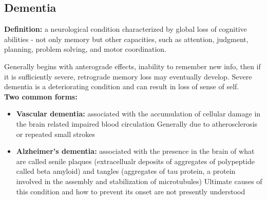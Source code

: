 \documentclass{article}
\begin{document}
\subsection{Dementia}
\textbf{Definition:} a neurological condition characterized by global loss of cognitive abilities - not only memory but other capacities, such as attention, judgment, planning, problem solving, and motor coordination. 

Generally begins with anterograde effects, inability to remember new info, then if it is sufficiently severe, retrograde memory loss may eventually develop. Severe dementia is a deteriorating condition and can result in loss of sense of self. \\

\noindent \textbf{Two common forms:}
\begin{itemize}
    \item \textbf{Vascular dementia:} associated with the accumulation of cellular damage in the brain related impaired blood circulation
        \subitem Generally due to atherosclerosis or repeated small strokes
    \item \textbf{Alzheimer's dementia:} associated with the presence in the brain of what are called senile plaques (extracellualr deposits of aggregates of polypeptide called beta amyloid) and tangles (aggregates of tau protein, a protein involved in the assembly and stabilization of microtubules) 
        \subitem Ultimate causes of this condition and how to prevent its onset are not presently understood 
\end{itemize}
\end{document}
